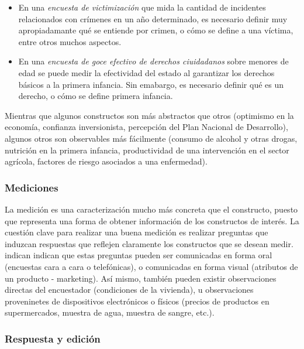 \documentclass[
  12pt,
  spanish,
]{book}
\providecommand{\tightlist}{%
  \setlength{\itemsep}{0pt}\setlength{\parskip}{0pt}}
\begin{document}
\begin{itemize}
\tightlist
\item
  En una \emph{encuesta de victimización} que mida la cantidad de incidentes relacionados con crímenes en un año determinado, es necesario definir muy apropiadamante qué se entiende por crimen, o cómo se define a una víctima, entre otros muchos aspectos.
\item
  En una \emph{encuesta de goce efectivo de derechos ciuidadanos} sobre menores de edad se puede medir la efectividad del estado al garantizar los derechos básicos a la primera infancia. Sin emabargo, es necesario definir qué es un derecho, o cómo se define primera infancia.
\end{itemize}

Mientras que algunos constructos son más abstractos que otros (optimismo en la economía, confianza inversionista, percepción del Plan Nacional de Desarrollo), algunos otros son observables más fácilmente (consumo de alcohol y otras drogas, nutrición en la primera infancia, productividad de una intervención en el sector agrícola, factores de riesgo asociados a una enfermedad).

\hypertarget{mediciones}{%
\subsubsection*{Mediciones}\label{mediciones}}

La medición es una caracterización mucho más concreta que el constructo, puesto que representa una forma de obtener información de los constructos de interés. La cuestión clave para realizar una buena medición es realizar preguntas que induzcan respuestas que reflejen claramente los constructos que se desean medir. \citet{Groves_Fowler_Couper_Lepkowski_Singer_Tourangeau_2009} indican indican que estas preguntas pueden ser comunicadas en forma oral (encuestas cara a cara o telefónicas), o comunicadas en forma visual (atributos de un producto - marketing). Así mismo, también pueden existir observaciones directas del encuestador (condiciones de la vivienda), u observaciones proveninetes de dispositivos electrónicos o físicos (precios de productos en supermercados, muestra de agua, muestra de sangre, etc.).

\hypertarget{respuesta-y-ediciuxf3n}{%
\subsubsection*{Respuesta y edición}\label{respuesta-y-ediciuxf3n}}
\end{document}
